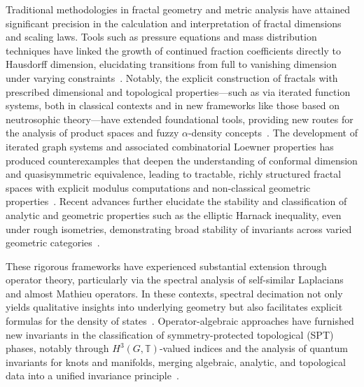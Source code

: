 \documentclass[sigconf]{acmart}
\begin{document}
Traditional methodologies in fractal geometry and metric analysis have attained significant precision in the calculation and interpretation of fractal dimensions and scaling laws. Tools such as pressure equations and mass distribution techniques have linked the growth of continued fraction coefficients directly to Hausdorff dimension, elucidating transitions from full to vanishing dimension under varying constraints~\cite{ref24,ref38}. Notably, the explicit construction of fractals with prescribed dimensional and topological properties—such as via iterated function systems, both in classical contexts and in new frameworks like those based on neutrosophic theory—have extended foundational tools, providing new routes for the analysis of product spaces and fuzzy $\alpha$-density concepts~\cite{ref10,ref8}. The development of iterated graph systems and associated combinatorial Loewner properties has produced counterexamples that deepen the understanding of conformal dimension and quasisymmetric equivalence, leading to tractable, richly structured fractal spaces with explicit modulus computations and non-classical geometric properties~\cite{ref11}. Recent advances further elucidate the stability and classification of analytic and geometric properties such as the elliptic Harnack inequality, even under rough isometries, demonstrating broad stability of invariants across varied geometric categories~\cite{ref40}.

These rigorous frameworks have experienced substantial extension through operator theory, particularly via the spectral analysis of self-similar Laplacians and almost Mathieu operators. In these contexts, spectral decimation not only yields qualitative insights into underlying geometry but also facilitates explicit formulas for the density of states~\cite{ref54,ref25}. Operator-algebraic approaches have furnished new invariants in the classification of symmetry-protected topological (SPT) phases, notably through $H^3(G,\mathbb{T})$-valued indices and the analysis of quantum invariants for knots and manifolds, merging algebraic, analytic, and topological data into a unified invariance principle~\cite{ref19,ref22,ref26,ref56}.
\end{document}
